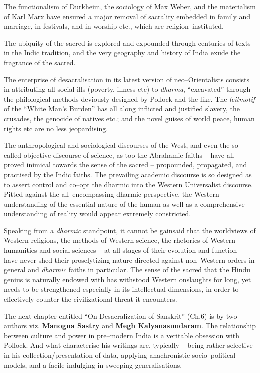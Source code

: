 The functionalism of Durkheim, the sociology of Max Weber, and the materialism of Karl Marx have ensured a major removal of sacrality embedded in family and marriage, in festivals, and in worship etc., which are religion–instituted.

The ubiquity of the sacred is explored and expounded through centuries of texts in the Indic tradition, and the very geography and history of India exude the fragrance of the sacred.

The enterprise of desacralisation in its latest version of neo–Orientalists consists in attributing all social ills (poverty, illness etc) to \textit{dharma}, “excavated” through the philological methods deviously designed by Pollock and the like. The \textit{leitmotif} of the “White Man’s Burden” has all along inflicted and justified slavery, the crusades, the genocide of natives etc.; and the novel guises of world peace, human rights etc are no less jeopardising.

The anthropological and sociological discourses of the West, and even the so–called objective discourse of science, as too the Abrahamic faiths – have all proved inimical towards the sense of the sacred – propounded, propagated, and practised by the Indic faiths. The prevailing academic discourse is so designed as to assert control and co–opt the dharmic into the Western Universalist discourse. Pitted against the all–encompassing dharmic perspective, the Western understanding of the essential nature of the human as well as a comprehensive understanding of reality would appear extremely constricted.

Speaking from a \textit{dhārmic} standpoint, it cannot be gainsaid that the worldviews of Western religions, the methods of Western science, the rhetorics of Western humanities and social sciences – at all stages of their evolution and function – have never shed their proselytizing nature directed against non–Western orders in general and \textit{dhārmic} faiths in particular. The sense of the sacred that the Hindu genius is naturally endowed with has withstood Western onslaughts for long, yet needs to be strengthened especially in its intellectual dimensions, in order to effectively counter the civilizational threat it encounters.

The next chapter entitled “On Desacralization of Sanskrit” (Ch.6) is by two authors viz. \textbf{Manogna Sastry} and \textbf{Megh Kalyanasundaram}. The relationship between culture and power in pre–modern India is a veritable obsession with Pollock. And what characterise his writings are, typically – being rather selective in his collection/presentation of data, applying anachronistic socio–political models, and a facile indulging in sweeping generalisations.

